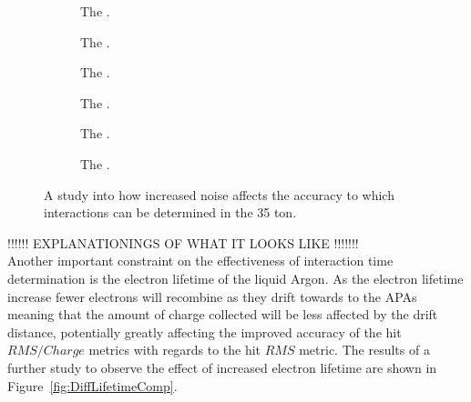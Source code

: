 \begin{figure}[h!]
  \centering
  \begin{subfigure}{0.45\textwidth}
    \centering
    \caption{The .}
    \label{fig:DiffNoiseComp1}
  \end{subfigure}
  \hspace{0.08\textwidth}
  \begin{subfigure}{0.45\textwidth}
    \centering
    \caption{The .}
    \label{fig:DiffNoiseComp2}
  \end{subfigure}
  \begin{subfigure}{0.45\textwidth}
    \centering
    \caption{The .}
    \label{fig:DiffNoiseComp3}
  \end{subfigure}
  \hspace{0.08\textwidth}
  \begin{subfigure}{0.45\textwidth}
    \centering
    \caption{The .}
    \label{fig:DiffNoiseComp4}
  \end{subfigure}
  \begin{subfigure}{0.45\textwidth}
    \centering
    \caption{The .}
    \label{fig:DiffNoiseComp5}
  \end{subfigure}
  \hspace{0.08\textwidth}
  \begin{subfigure}{0.45\textwidth}
    \centering
    \caption{The .}
    \label{fig:DiffNoiseComp6}
  \end{subfigure}
  \caption[The effect of increased noise in the accuracy of interaction time determination]
          {A study into how increased noise affects the accuracy to which interactions can be determined in the 35 ton.}
          \label{fig:DiffNoiseComp}
\end{figure}

!!!!!! EXPLANATIONINGS OF WHAT IT LOOKS LIKE !!!!!!! \\

Another important constraint on the effectiveness of interaction time determination is the electron lifetime of the liquid Argon. As the electron lifetime increase fewer electrons will recombine as they drift towards to the APAs meaning that the amount of charge collected will be less affected by the drift distance, potentially greatly affecting the improved accuracy of the hit $RMS/Charge$ metrics with regards to the hit $RMS$ metric. The results of a further study to observe the effect of increased electron lifetime are shown in Figure~\ref{fig:DiffLifetimeComp}. \\

